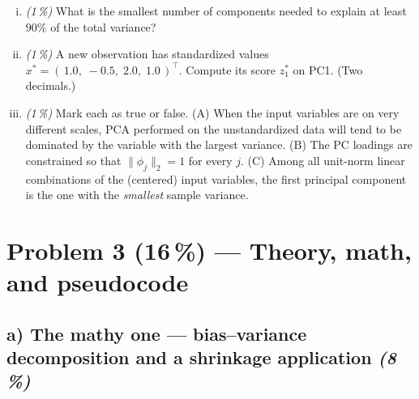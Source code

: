 \documentclass[11pt,a4paper]{article}
\newcommand{\points}[1]{\textbf{(#1\,\%)}}
\newcommand{\subpoints}[1]{\textit{(#1\,\%)}}
\begin{document}
\begin{enumerate}[(i)]
  \item \subpoints{1} What is the smallest number of components needed to explain at least $90\%$ of the total variance?
  \item \subpoints{1} A new observation has standardized values $x^* = (\,1.0,\;-0.5,\;2.0,\;1.0\,)^\top$. Compute its score $z^*_1$ on PC1. (Two decimals.)
  \item \subpoints{1} Mark each as true or false. (A) When the input variables are on very different scales, PCA performed on the unstandardized data will tend to be dominated by the variable with the largest variance. (B) The PC loadings are constrained so that $\|\phi_j\|_2 = 1$ for every $j$. (C) Among all unit-norm linear combinations of the (centered) input variables, the first principal component is the one with the \emph{smallest} sample variance.
\end{enumerate}

\vfill\eject

\section*{Problem 3 \points{16} --- Theory, math, and pseudocode}

\subsection*{a) The mathy one --- bias--variance decomposition and a shrinkage application \subpoints{8}}
\end{document}
